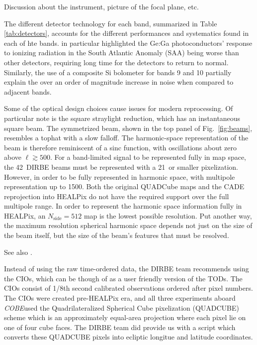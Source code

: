 \documentclass{aa}
\def\COBE{\textit{COBE}}
\begin{document}
Discussion about the instrument, picture of the focal plane, etc.

The different detector technology for each band, summarized in Table \ref{tab:detectors}, accounts for the different performances and systematics found in each of hte bands. \citet{silverberg93} in particular highlighted the Ge:Ga photoconductors' response to ionizing radiation in the South Atlantic Anomaly (SAA) being worse than other detectors, requiring long time for the detectors to return to normal. Similarly, the use of a composite Si bolometer for bands 9 and 10 partially explain the over an order of magnitude increase in noise when compared to adjacent bands.


Some of the optical design choices cause issues for modern reprocessing. Of particular note is the square straylight reduction, which has an instantaneous square beam. The symmetrized beam, shown in the top panel of Fig.~\ref{fig:beams}, resembles a tophat with a slow falloff. The harmonic-space representation of the beam is therefore reminiscent of a sinc function, with oscillations about zero above $\ell\gtrsim500$. For a band-limited signal to be represented fully in map space, the 42\arcm\ DIRBE beams must be represented with a 21\arcm\ or smaller pixelization. However, in order to be fully represented in harmonic space, with multipole representation up to 1500. Both the original QUADCube maps and the CADE reprojection into HEALPix do not have the required support over the full multipole range. In order to represent the harmonic space information fully in HEALPix, an $N_\mathrm{side}=512$ map is the lowest possible resolution. Put another way, the maximum resolution spherical harmonic space depends not just on the size of the beam itself, but the size of the beam's features that must be resolved.

% 


See also \citet{cobe_exsupp}.

Instead of using the raw time-ordered data, the DIRBE team recommends using the CIOs, which can be though of as a user friendly version of the TODs. The CIOs consist of 1/8th second calibrated observations ordered after pixel numbers. The CIOs were created pre-HEALPix era, and all three experiments aboard \COBE used the Quadrilateralized Spherical Cube pixelization (QUADCUBE) scheme which is an approximately equal-area projection where each pixel lie on one of four cube faces. The DIRBE team did provide us with a script which converts these QUADCUBE pixels into ecliptic longitue and latitude coordinates.
\end{document}
